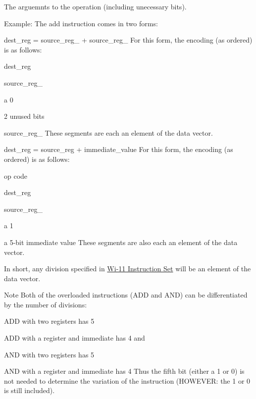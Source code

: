 The arguemnts to the operation (including unecessary bits). 

\begin{DoxyParagraph}{Example:}
The add instruction comes in two forms: 
\end{DoxyParagraph}
\begin{DoxyParagraph}{}
\begin{DoxyItemize}
\item dest\_\-reg = source\_\-reg\_ + source\_\-reg\_ For this form, the encoding (as ordered) is as follows: 
\begin{DoxyItemize}
\item dest\_\-reg 
\item source\_\-reg\_ 
\item a 0 
\item 2 unused bits 
\item source\_\-reg\_ These segments are each an element of the data vector. 
\end{DoxyItemize}\end{DoxyItemize}

\end{DoxyParagraph}
\begin{DoxyParagraph}{}
\begin{DoxyItemize}
\item dest\_\-reg = source\_\-reg + immediate\_\-value For this form, the encoding (as ordered) is as follows: 
\begin{DoxyItemize}
\item op code 
\item dest\_\-reg 
\item source\_\-reg\_ 
\item a 1 
\item a 5-\/bit immediate value These segments are also each an element of the data vector. 
\end{DoxyItemize}In short, any division specified in \hyperlink{index_instructions}{Wi-\/11 Instruction Set} will be an element of the data vector.\end{DoxyItemize}

\end{DoxyParagraph}
\begin{DoxyNote}{Note}
Both of the overloaded instructions (ADD and AND) can be differentiated by the number of divisions: \begin{DoxyItemize}
\item ADD with two registers has 5 \item ADD with a register and immediate has 4 and \item AND with two registers has 5 \item AND with a register and immediate has 4 Thus the fifth bit (either a 1 or 0) is not needed to determine the variation of the instruction (HOWEVER: the 1 or 0 is still included). \end{DoxyItemize}

\end{DoxyNote}
